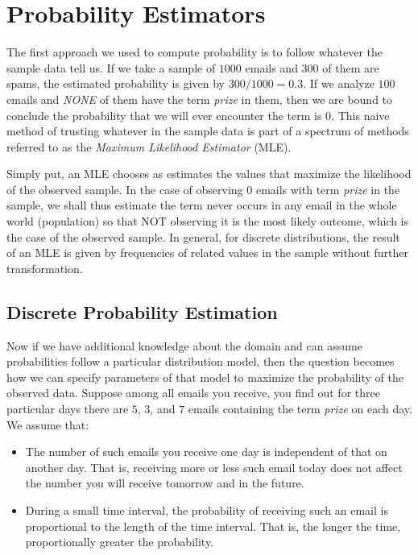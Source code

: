 \documentclass[
  letterpaper,
]{scrbook}
\begin{document}
\section{Probability Estimators}\label{probability-estimators-1}

The first approach we used to compute probability is to follow whatever
the sample data tell us. If we take a sample of \(1000\) emails and
\(300\) of them are spams, the estimated probability is given by
\(300/1000 = 0.3\). If we analyze \(100\) emails and \emph{NONE} of them
have the term \emph{prize} in them, then we are bound to conclude the
probability that we will ever encounter the term is \(0\). This naive
method of trusting whatever in the sample data is part of a spectrum of
methods referred to as the \emph{Maximum Likelihood Estimator} (MLE).

Simply put, an MLE chooses as estimates the values that maximize the
likelihood of the observed sample. In the case of observing \(0\) emails
with term \emph{prize} in the sample, we shall thus estimate the term
never occurs in any email in the whole world (population) so that NOT
observing it is the most likely outcome, which is the case of the
observed sample. In general, for discrete distributions, the result of
an MLE is given by frequencies of related values in the sample without
further transformation.

\subsection{Discrete Probability
Estimation}\label{discrete-probability-estimation}

Now if we have additional knowledge about the domain and can assume
probabilities follow a particular distribution model, then the question
becomes how we can specify parameters of that model to maximize the
probability of the observed data. Suppose among all emails you receive,
you find out for three particular days there are \(5\), \(3\), and \(7\)
emails containing the term \emph{prize} on each day. We assume that:

\begin{itemize}
\item
  The number of such emails you receive one day is independent of that
  on another day. That is, receiving more or less such email today does
  not affect the number you will receive tomorrow and in the future.
\item
  During a small time interval, the probability of receiving such an
  email is proportional to the length of the time interval. That is, the
  longer the time, proportionally greater the probability.
\end{itemize}
\end{document}
